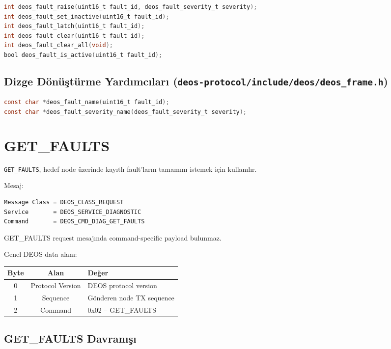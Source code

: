 \documentclass[a4paper,11pt]{article}
\newcommand{\code}[1]{\texttt{#1}}
\begin{document}
\begin{lstlisting}[language=C]
int deos_fault_raise(uint16_t fault_id, deos_fault_severity_t severity);
int deos_fault_set_inactive(uint16_t fault_id);
int deos_fault_latch(uint16_t fault_id);
int deos_fault_clear(uint16_t fault_id);
int deos_fault_clear_all(void);
bool deos_fault_is_active(uint16_t fault_id);
\end{lstlisting}

\subsection{Dizge Dönüştürme Yardımcıları (\code{deos-protocol/include/deos/deos\_frame.h})}

\begin{lstlisting}[language=C]
const char *deos_fault_name(uint16_t fault_id);
const char *deos_fault_severity_name(deos_fault_severity_t severity);
\end{lstlisting}

\section{GET\_FAULTS}

\texttt{GET\_FAULTS}, hedef node üzerinde kayıtlı fault'ların tamamını
istemek için kullanılır.

Mesaj:

\begin{lstlisting}
Message Class = DEOS_CLASS_REQUEST
Service       = DEOS_SERVICE_DIAGNOSTIC
Command       = DEOS_CMD_DIAG_GET_FAULTS
\end{lstlisting}

GET\_FAULTS request mesajında command-specific payload bulunmaz.

Genel DEOS data alanı:

\begin{center}
\begin{tabular}{c c l}
\toprule
\textbf{Byte} & \textbf{Alan} & \textbf{Değer} \\
\midrule
0 & Protocol Version & DEOS protocol version \\
1 & Sequence         & Gönderen node TX sequence \\
2 & Command          & 0x02 -- GET\_FAULTS \\
\bottomrule
\end{tabular}
\end{center}

\subsection{GET\_FAULTS Davranışı}
\end{document}
